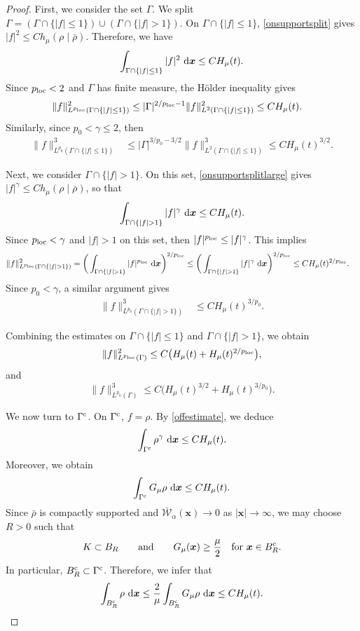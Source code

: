 \documentclass[reqno,11pt]{amsart}
\numberwithin{equation}{section}
\theoremstyle{definition}
\def\dd{{\, \rm d}}
\begin{document}
\begin{proof}
First, we consider the set $\Gamma$.  We split $\Gamma=(\Gamma\cap\{|f|\le1\})\cup (\Gamma\cap\{|f|>1\}).$
On $\Gamma\cap\{|f|\le1\}$, 
\eqref{onsupportsplit} gives $|f|^2 \le C h_\mu(\rho\mid\bar\rho).$
Therefore, we have
\[\int_{\Gamma\cap\{|f|\le1\}} |f|^2\,\dd\boldsymbol{x}  \le   C H_\mu(t).
\]
Since $p_{\rm loc}<2$ and $\Gamma$ has finite measure, 
the H\"older inequality gives
\[
\begin{aligned}
 \|f\|_{L^{p_{\rm loc}}(\Gamma\cap\{|f|\le1\})}^2  &\le
 |\Gamma|^{2/p_{\rm loc}-1} \|f\|_{L^2(\Gamma\cap\{|f|\le1\})}^2          \le C H_\mu(t).
\end{aligned}
\]
Similarly, since $p_0<\gamma\le2$, then 
\[
\begin{aligned}  \|f\|_{L^{p_0}(\Gamma\cap\{|f|\le1\})}^3 &\le |\Gamma|^{3/p_0-3/2} \|f\|_{L^2(\Gamma\cap\{|f|\le1\})}^3\le C H_\mu(t)^{3/2}.
\end{aligned}
\]

Next, we consider $\Gamma\cap\{|f|>1\}$.  On this set, \eqref{onsupportsplitlarge} gives $|f|^\gamma \le C h_\mu(\rho\mid\bar\rho)$,
so that
\[\int_{\Gamma\cap\{|f|>1\}} |f|^\gamma\,\dd\boldsymbol{x}  \le  C H_\mu(t).
\]
Since $p_{\rm loc}<\gamma$ and $|f|>1$ on this set, then $|f|^{p_{\rm loc}}\le |f|^\gamma$. This implies 
\[
\begin{aligned} \|f\|_{L^{p_{\rm loc}}(\Gamma\cap\{|f|>1\})}^2
&= \bigg(\int_{\Gamma\cap\{|f|>1\}} |f|^{p_{\rm loc}} \,\dd\boldsymbol{x}
   \bigg)^{2/p_{\rm loc}}
   \le \bigg( \int_{\Gamma\cap\{|f|>1\}} |f|^\gamma
 \,\dd\boldsymbol{x} \bigg)^{2/p_{\rm loc}}
 \le C H_\mu(t)^{2/p_{\rm loc}}.
\end{aligned}
\]
Since $p_0<\gamma$, a similar argument gives
\[
\begin{aligned}  \|f\|_{L^{p_0}(\Gamma\cap\{|f|>1\})}^3  &\le  C H_\mu(t)^{3/p_0}.
\end{aligned}
\]

Combining the estimates on $\Gamma\cap\{|f|\le1\}$ and
$\Gamma\cap\{|f|>1\}$, we obtain
\begin{equation}\label{S-ploc}  \|f\|_{L^{p_{\rm loc}}(\Gamma)}^2  \le  C\big(  H_\mu(t)+H_\mu(t)^{2/p_{\rm loc}} \big),
\end{equation}
and
\begin{equation}\label{S-po} \|f\|_{L^{p_0}(\Gamma)}^3 \le C\big( H_\mu(t)^{3/2} + H_\mu(t)^{3/p_0} \big).
\end{equation}

We now turn to $\Gamma^{\rm c}$.  On $\Gamma^{\rm c}$, $f=\rho$.  By
\eqref{offestimate}, we deduce 
\[ 
\int_{\Gamma^{\rm c}}\rho^\gamma\,\dd\boldsymbol{x} \le C H_\mu(t).
\]
Moreover, we obtain
\[\int_{\Gamma^{\rm c}}G_\mu\rho\,\dd\boldsymbol{x} \le C H_\mu(t).
\]
Since $\bar\rho$ is compactly supported and
$\bar{\mathcal W}_\alpha(\boldsymbol{x})\to0$ as
$|\boldsymbol{x}|\to\infty$, we may choose $R>0$ such that
\[K\subset B_R\qquad\text{and}\qquad G_\mu(\boldsymbol{x})\ge \frac{\mu}{2} \quad\text{for } \boldsymbol{x}\in B_R^{\rm c} .
\]
In particular, $B_R^{\rm c}\subset\Gamma^{\rm c}$. Therefore, we infer that
\[ \int_{B_R^{\rm c}}\rho\,\dd\boldsymbol{x} \le \frac2\mu \int_{B_R^{\rm c}}G_\mu\rho\,\dd\boldsymbol{x} \le C H_\mu(t).
\]


\end{proof}
\end{document}
